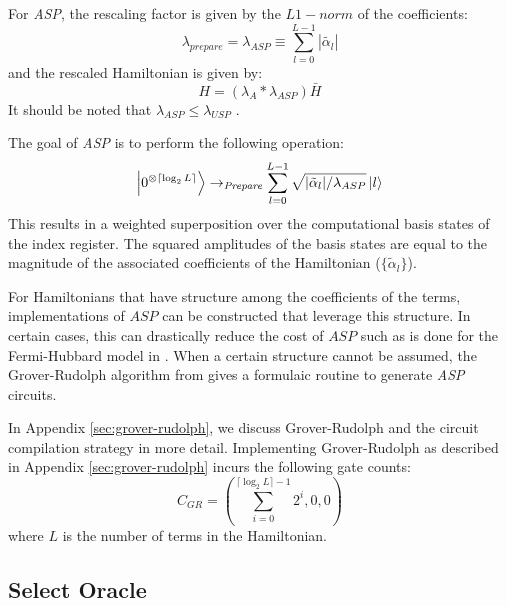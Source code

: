 For \textit{ASP}, the rescaling factor is given by the $L1-norm$ of the coefficients:
\begin{equation}
    \label{eq:asp-scale}
    \lambda_{prepare} = \lambda_{ASP} \equiv \sum_{l=0}^{L-1} | \tilde{\alpha_l} |
\end{equation}
and the rescaled Hamiltonian is given by:
\begin{equation}
    H = (\lambda_A * \lambda_{ASP}) \bar{H}
\end{equation}
It should be noted that $\lambda_{ASP} \leq \lambda_{USP}$  .

The goal of \textit{ASP} is to perform the following operation:
\begin{equation}
    \ket{0^{\otimes \lceil \log_2{L} \rceil}} \rightarrow_{\textit{Prepare}} \sum_{l = 0}^{L-1} \sqrt{|\tilde{\alpha}_l| / \lambda_{ASP}} \ket{l}
\end{equation}
This results in a weighted superposition over the computational basis states of the index register.
The squared amplitudes of the basis states are equal to the magnitude of the associated coefficients of the Hamiltonian ($\{\tilde{\alpha}_l\}$).

For Hamiltonians that have structure among the coefficients of the terms, implementations of $\textit{ASP}$ can be constructed that leverage this structure.
In certain cases, this can drastically reduce the cost of $\textit{ASP}$ such as is done for the Fermi-Hubbard model in \cite{babbush2018encoding}.
When a certain structure cannot be assumed, the Grover-Rudolph algorithm from \cite{grover2002creating} gives a formulaic routine to generate \textit{ASP} circuits.

In Appendix \ref{sec:grover-rudolph}, we discuss Grover-Rudolph and the circuit compilation strategy in more detail.
Implementing Grover-Rudolph as described in Appendix \ref{sec:grover-rudolph} incurs the following gate counts:
\begin{equation}
    C_{GR} = (\sum_{i=0}^{\lceil \log_2{L} \rceil - 1} 2^i, 0, 0)
\end{equation}
where $L$ is the number of terms in the Hamiltonian.

\subsection{Select Oracle}
\label{subsec:select}

